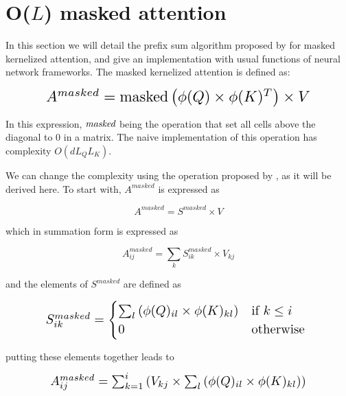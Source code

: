 \section{O($L$) masked attention}

In this section we will detail the prefix sum algorithm proposed by
\citet{choromanski2021rethinking} for
 masked kernelized attention, and give an implementation with usual
functions of neural network frameworks. The masked kernelized attention is defined as:

\begin{equation}
\resizebox{0.8\hsize}{!}{$
	A^{masked} = \mathrm{masked} \left( \phi(Q) \times \phi(K)^T \right) \times V
$}
\end{equation}

In this expression, $\emph{masked}$ being the operation that set all cells
 above the diagonal to 0 in a matrix. The naive implementation of this
 operation has complexity $O(dL_QL_K)$.

We can change the complexity using the operation proposed by
 \citet{choromanski2021rethinking}, as it will be derived  here.
 To start with, $A^{masked}$ is expressed as

\begin{equation}
A^{masked} = S^{masked} \times V
\end{equation}

\noindent{}which
in summation form is expressed as

\begin{equation}
A^{masked}_{ij} = \sum_k S^{masked}_{ik} \times V_{kj}
\end{equation}

\noindent{}and the
elements of $S^{masked}$ are defined as

\begin{equation}
	\resizebox{0.8\hsize}{!}{$
		S^{masked}_{ik} =
		\begin{cases}
		\sum_l \left( \phi(Q)_{il} \times \phi(K)_{kl} \right) & \text{if } k \leq i\\
		0 & \text{otherwise} 
		\end{cases}$
	}
\end{equation}

\noindent{}putting these elements together leads to

\begin{equation}
	\resizebox{0.8\hsize}{!}{
		$A^{masked}_{ij}= \sum_{k=1}^i \left( V_{kj} \times \sum_l \left( \phi(Q)_{il} \times \phi(K)_{kl} \right) \right)$
	}
\end{equation}


